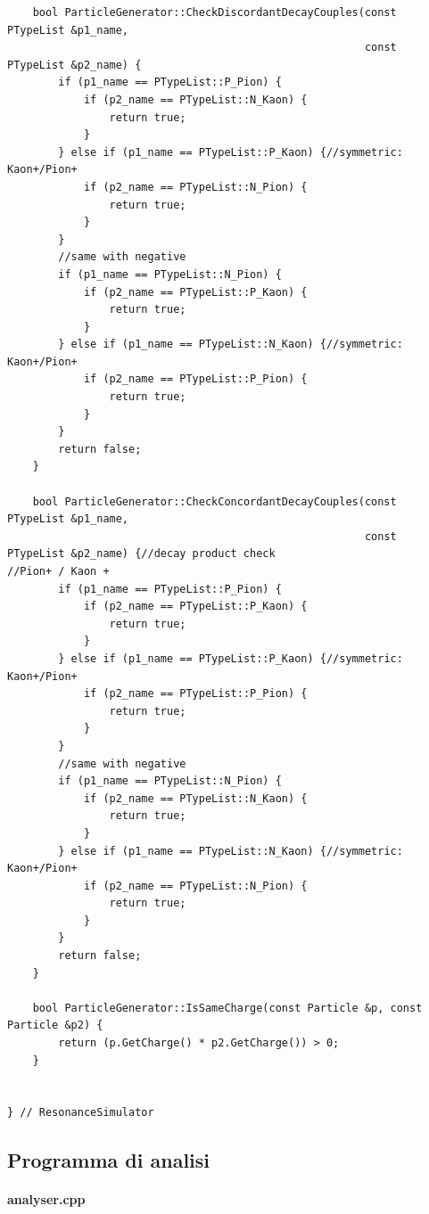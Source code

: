 \documentclass[12pt, a4paper]{article}
\begin{document}
\begin{verbatim}
    bool ParticleGenerator::CheckDiscordantDecayCouples(const PTypeList &p1_name,
                                                        const PTypeList &p2_name) {
        if (p1_name == PTypeList::P_Pion) {
            if (p2_name == PTypeList::N_Kaon) {
                return true;
            }
        } else if (p1_name == PTypeList::P_Kaon) {//symmetric: Kaon+/Pion+
            if (p2_name == PTypeList::N_Pion) {
                return true;
            }
        }
        //same with negative
        if (p1_name == PTypeList::N_Pion) {
            if (p2_name == PTypeList::P_Kaon) {
                return true;
            }
        } else if (p1_name == PTypeList::N_Kaon) {//symmetric: Kaon+/Pion+
            if (p2_name == PTypeList::P_Pion) {
                return true;
            }
        }
        return false;
    }

    bool ParticleGenerator::CheckConcordantDecayCouples(const PTypeList &p1_name,
                                                        const PTypeList &p2_name) {//decay product check
//Pion+ / Kaon +
        if (p1_name == PTypeList::P_Pion) {
            if (p2_name == PTypeList::P_Kaon) {
                return true;
            }
        } else if (p1_name == PTypeList::P_Kaon) {//symmetric: Kaon+/Pion+
            if (p2_name == PTypeList::P_Pion) {
                return true;
            }
        }
        //same with negative
        if (p1_name == PTypeList::N_Pion) {
            if (p2_name == PTypeList::N_Kaon) {
                return true;
            }
        } else if (p1_name == PTypeList::N_Kaon) {//symmetric: Kaon+/Pion+
            if (p2_name == PTypeList::N_Pion) {
                return true;
            }
        }
        return false;
    }

    bool ParticleGenerator::IsSameCharge(const Particle &p, const Particle &p2) {
        return (p.GetCharge() * p2.GetCharge()) > 0;
    }


} // ResonanceSimulator
\end{verbatim}

\subsection{Programma di analisi}

\paragraph{analyser.cpp}
\end{document}
